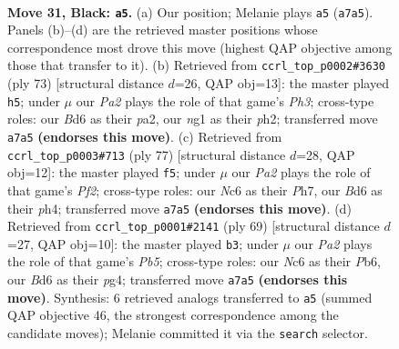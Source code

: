 \documentclass[11pt]{article}
\begin{document}
\clearpage

\begin{figure}[p]\centering
\begin{subfigure}{0.46\textwidth}\centering
\resizebox{\linewidth}{!}{%
\newchessgame
\chessboard[
  setfen={2k5/p7/2nb2p1/6P1/8/3bB3/8/4K1N1 b - - 1 31},
  showmover=false,
  pgfstyle=straightmove, color=movearrow, markmove={a7-a5}
]}
\caption{}
\end{subfigure}\hfill
\begin{subfigure}{0.46\textwidth}\centering
\resizebox{\linewidth}{!}{%
\newchessgame
\chessboard[
  setfen={8/1p3k2/7p/5n2/5B2/8/P5KP/8 b - - 1 37},
  showmover=false,
  pgfstyle=straightmove, color=movearrow, markmove={h6-h5}
]}
\caption{}
\end{subfigure}
\\[4pt]
\begin{subfigure}{0.46\textwidth}\centering
\resizebox{\linewidth}{!}{%
\newchessgame
\chessboard[
  setfen={5k2/5p1p/8/3Bb3/7P/p7/3PK1P1/8 b - - 0 39},
  showmover=false,
  pgfstyle=straightmove, color=movearrow, markmove={f7-f5}
]}
\caption{}
\end{subfigure}\hfill
\begin{subfigure}{0.46\textwidth}\centering
\resizebox{\linewidth}{!}{%
\newchessgame
\chessboard[
  setfen={6k1/7p/1p1B4/8/1pb2KP1/8/1P5P/8 b - - 3 35},
  showmover=false,
  pgfstyle=straightmove, color=movearrow, markmove={b4-b3}
]}
\caption{}
\end{subfigure}
\caption{\textbf{Move 31, Black: \texttt{a5}.} (a) Our position; Melanie plays \texttt{a5} (\texttt{a7a5}). Panels (b)--(d) are the retrieved master positions whose correspondence most drove this move (highest QAP objective among those that transfer to it). (b) Retrieved from \texttt{ccrl\_top\_p0002\#3630} (ply 73) [structural distance $d$=26, QAP obj=13]: the master played \texttt{h5}; under $\mu$ our \emph{Pa2} plays the role of that game's \emph{Ph3}; cross-type roles: our \emph{B}d6 as their \emph{p}a2, our \emph{n}g1 as their \emph{p}h2; transferred move \texttt{a7a5} \textbf{(endorses this move)}. (c) Retrieved from \texttt{ccrl\_top\_p0003\#713} (ply 77) [structural distance $d$=28, QAP obj=12]: the master played \texttt{f5}; under $\mu$ our \emph{Pa2} plays the role of that game's \emph{Pf2}; cross-type roles: our \emph{N}c6 as their \emph{P}h7, our \emph{B}d6 as their \emph{p}h4; transferred move \texttt{a7a5} \textbf{(endorses this move)}. (d) Retrieved from \texttt{ccrl\_top\_p0001\#2141} (ply 69) [structural distance $d$=27, QAP obj=10]: the master played \texttt{b3}; under $\mu$ our \emph{Pa2} plays the role of that game's \emph{Pb5}; cross-type roles: our \emph{N}c6 as their \emph{P}b6, our \emph{B}d6 as their \emph{p}g4; transferred move \texttt{a7a5} \textbf{(endorses this move)}. Synthesis: 6 retrieved analogs transferred to \texttt{a5} (summed QAP objective 46, the strongest correspondence among the candidate moves); Melanie committed it via the \texttt{search} selector.}
\label{fig:thought-m61}
\end{figure}
\end{document}
